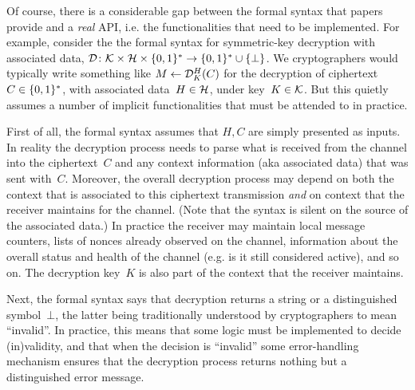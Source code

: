 Of course, there is a considerable gap between the formal syntax that
papers provide and a \emph{real} API, i.e. the functionalities that
need to be implemented.  For example, consider the
the formal syntax for symmetric-key decryption with associated data, $\mathcal{D}\colon\mathcal{K}
\times \mathcal{H} \times \{0,1\}^* \to \{0,1\}^* \cup \{\bot\}$.  We
cryptographers would typically write something like $M \gets
\mathcal{D}^H_K(C)$ for the decryption of ciphertext~$C\in\{0,1\}^*$, with associated
data~$H \in \mathcal{H}$, under key~$K \in \mathcal{K}$.  
But this quietly assumes a number of implicit functionalities that
must be attended to in practice.  

First of all, the formal syntax assumes that $H,C$ are simply
presented as inputs.  In reality the decryption process needs to parse what is received from the
channel into the ciphertext~$C$ and any context information (aka
associated data) that was sent with~$C$.  Moreover, the overall
decryption process may depend on both the context that is associated
to this ciphertext transmission \emph{and} on context that the
receiver maintains for the channel.  (Note that the syntax is silent
on the source of the associated data.)  In practice the receiver may
maintain local message counters, lists of nonces already observed on
the channel, information about the overall status and health of the channel
(e.g. is it still considered active), and so on.  The decryption
key~$K$ is also part of the context that the receiver maintains.

Next, the formal syntax says that decryption returns a
string or a distinguished symbol~$\bot$, the latter being
traditionally understood by cryptographers to mean ``invalid''.  In
practice, this means that some logic must be implemented to decide
(in)validity, and that when the decision is ``invalid'' some
error-handling mechanism ensures that the decryption process returns
nothing but a distinguished error message.


